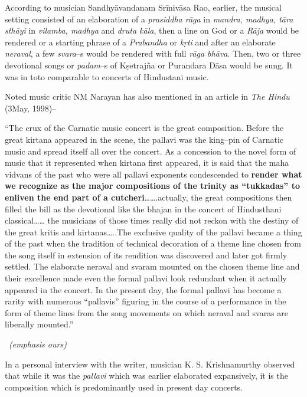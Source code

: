 According to musician Sandhyāvandanam Srīnivāsa Rao, earlier, the musical setting consisted of an elaboration of a \textit{prasiddha rāga} in \textit{mandra, madhya, tāra sthāyi} in \textit{vilamba, madhya} and \textit{druta kāla}, then a line on God or a \textit{Rāja} would be rendered or a starting phrase of a \textit{Prabandha} or \textit{kṛti} and after an elaborate \textit{neraval}, a few \textit{svara}–s would be rendered with full \textit{rāga bhāva}. Then, two or three devotional songs or \textit{padam}–s of Kṣetrajña or Purandara Dāsa would be sung. It was in toto comparable to concerts of Hindustani music.

Noted music critic NM Narayan has also mentioned in an article in \textit{The Hindu} (3May, 1998)–

\begin{myquote}
“The crux of the Carnatic music concert is the great composition. Before the great kirtana appeared in the scene, the pallavi was the king–pin of Carnatic music and spread itself all over the concert. As a concession to the novel form of music that it represented when kirtana first appeared, it is said that the maha vidvans of the past who were all pallavi exponents condescended to \textbf{render what we recognize as the major compositions of the trinity as “tukkadas” to enliven the end part of a cutcheri}…….actually, the great compositions then filled the bill as the devotional like the bhajan in the concert of Hindusthani classical…… the musicians of those times really did not reckon with the destiny of the great kritis and kirtanas…..The exclusive quality of the pallavi became a thing of the past when the tradition of technical decoration of a theme line chosen from the song itself in extension of its rendition was discovered and later got firmly settled. The elaborate neraval and svaram mounted on the chosen theme line and their excellence made even the formal pallavi look redundant when it actually appeared in the concert. In the present day, the formal pallavi has become a rarity with numerous “pallavis” figuring in the course of a performance in the form of theme lines from the song movements on which neraval and svaras are liberally mounted.” 

~\hfill \textit{(emphasis ours)}
\end{myquote}

In a personal interview with the writer, musician K. S. Krishnamurthy observed that while it was the \textit{pallavi} which was earlier elaborated expansively, it is the composition which is predominantly used in present day concerts.


